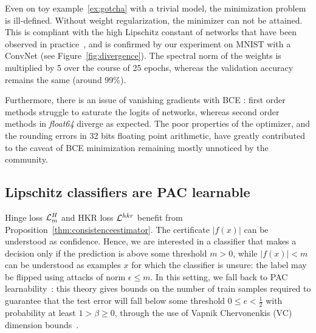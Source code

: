         Even on toy example~\ref{ex:gotcha} with a trivial model, the minimization problem is ill-defined. Without weight regularization, the minimizer can not be attained. This is compliant with the high Lipschitz constant of \LipInf networks that have been observed in practice~\cite{scaman2018lipschitz}, and is confirmed by our experiment on MNIST with a ConvNet (see Figure~\ref{fig:divergence}). The spectral norm of the weights is multiplied by 5 over the course of 25 epochs, whereas the validation accuracy remains the same (around 99\%).
          
        Furthermore, there is an issue of vanishing gradients with BCE : first order methods struggle to saturate the logits of \LipInf networks, whereas second order methods in \textit{float64} diverge as expected. The poor properties of the optimizer, and the rounding errors in 32 bits floating point arithmetic, have greatly contributed to the caveat of BCE minimization remaining mostly unnoticed by the community.  
        
    \subsection{Lipschitz classifiers are PAC learnable}
    
        Hinge loss $\mathcal{L}^H_m$ and HKR loss $\mathcal{L}^{hkr}$ benefit from Proposition~\ref{thm:consistenceestimator}. The certificate $|f(x)|$ can be understood as confidence. Hence, we are interested in a classifier that makes a decision only if the prediction is above some threshold $m>0$, while $|f(x)|<m$ can be understood as examples $x$ for which the classifier is unsure: the label may be flipped using attacks of norm $\epsilon\leq m$. In this setting, we fall back to PAC learnability~\cite{valiant1984theory}: this theory gives bounds on the number of train samples required to guarantee that the test error will fall below some threshold $0\leq e<\frac{1}{2}$ with probability at least $1>\beta\geq 0$, through the use of Vapnik Chervonenkis (VC) dimension bounds~\cite{vapnik2015uniform}.  
          
